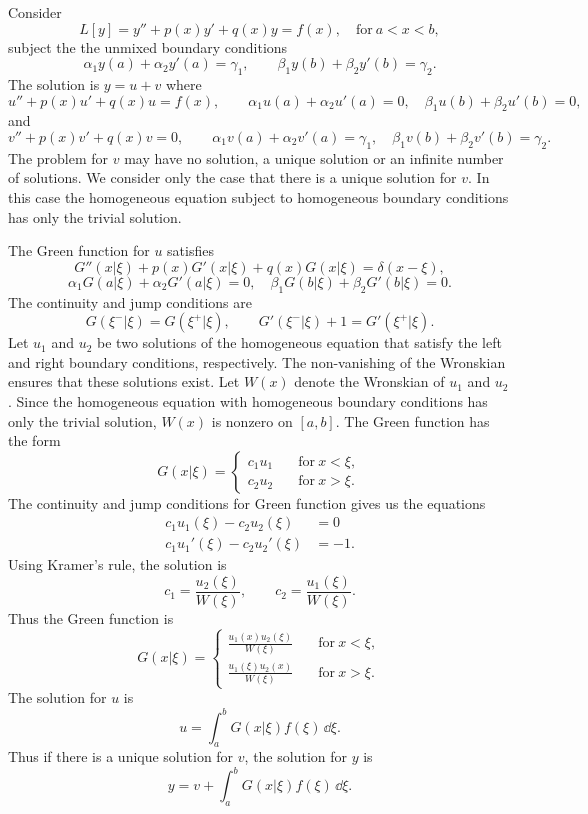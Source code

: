 Consider 
\[
L[y] = y'' + p(x) y' + q(x) y = f(x), \quad \mathrm{for}\ a < x < b,
\]
subject the the unmixed boundary conditions
\[
\alpha_1 y(a) + \alpha_2 y'(a) = \gamma_1, \qquad 
\beta_1 y(b) + \beta_2 y'(b) = \gamma_2.
\]
The solution is $y = u + v$ where
\[
u'' + p(x) u' + q(x) u = f(x), \qquad \alpha_1 u(a) + \alpha_2 u'(a) = 0, 
\quad \beta_1 u(b) + \beta_2 u'(b) = 0,
\]
and
\[
v'' + p(x) v' + q(x) v = 0, \qquad \alpha_1 v(a) + \alpha_2 v'(a) = \gamma_1, 
\quad \beta_1 v(b) + \beta_2 v'(b) = \gamma_2.
\]
The problem for $v$ may have no solution, a unique solution or an infinite
number of solutions.  We consider only the case that there is a unique solution
for $v$.  In this case the homogeneous equation subject to homogeneous
boundary conditions has only the trivial solution.

The Green function for $u$ satisfies
\[
G''(x|\xi) + p(x) G'(x|\xi) + q(x) G(x|\xi) = \delta(x-\xi), 
\]
\[
\alpha_1 G(a|\xi) + \alpha_2 G'(a|\xi) = 0, \quad 
\beta_1 G(b|\xi) + \beta_2 G'(b|\xi) = 0.
\]
The continuity and jump conditions are
\[
G(\xi^-|\xi) = G(\xi^+|\xi), \qquad G'(\xi^-|\xi) + 1 = G'(\xi^+|\xi).
\]
Let $u_1$ and $u_2$ be two solutions of the homogeneous equation that satisfy
the left and right boundary conditions, respectively.  The non-vanishing 
of the Wronskian ensures that these solutions exist.  Let $W(x)$ denote
the Wronskian of $u_1$ and $u_2$.  Since the homogeneous equation with 
homogeneous boundary conditions has only the trivial solution, $W(x)$ is
nonzero on $[a,b]$.  The Green function has the form
\[
G(x|\xi) = 
\begin{cases}
  c_1 u_1 \quad &\mathrm{for}\ x < \xi, \\
  c_2 u_2 \quad &\mathrm{for}\ x > \xi.
\end{cases}
\]
The continuity and jump conditions for Green function gives us the 
equations
\begin{align*}
  c_1 u_1(\xi) - c_2 u_2(\xi) &= 0 \\
  c_1 u_1'(\xi) - c_2 u_2'(\xi) &= -1.
\end{align*}
Using Kramer's rule, the solution is
\[
c_1 = \frac{u_2(\xi)}{W(\xi)}, \qquad
c_2 = \frac{u_1(\xi)}{W(\xi)}.
\]
Thus the Green function is
\[
G(x|\xi) = 
\begin{cases}
  \frac{u_1(x) u_2(\xi)}{W(\xi)} \quad &\mathrm{for}\ x < \xi, \\
  \frac{u_1(\xi) u_2(x)}{W(\xi)} \quad &\mathrm{for}\ x > \xi.
\end{cases}
\]
The solution for $u$ is
\[
u = \int_a^b G(x|\xi) f(\xi) \,\dd \xi.
\]
Thus if there is a unique solution for $v$, the solution for $y$ is
\[
y = v + \int_a^b G(x|\xi) f(\xi) \,\dd \xi.
\]




